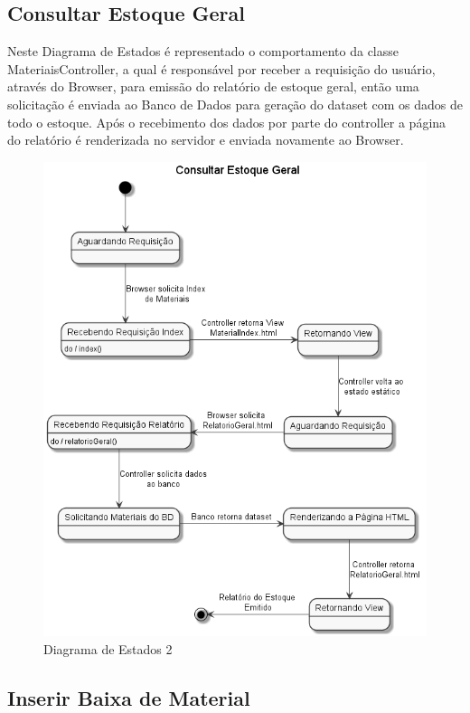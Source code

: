 \documentclass[rascunho,xindy,acronym,symbols]{fei}
\begin{document}
\pagebreak

\subsection{Consultar Estoque Geral}

Neste Diagrama de Estados é representado o comportamento da classe MateriaisController, a qual é responsável por receber a requisição do usuário, através do Browser, para emissão do relatório de estoque geral, então uma solicitação é enviada ao Banco de Dados para geração do dataset com os dados de todo o estoque. Após o recebimento dos dados por parte do controller a página do relatório é renderizada no servidor e enviada novamente ao Browser.

\begin{figure}[H]
    \centering
    \includegraphics[scale=0.6, width=400pt]{./Images/DE_-_Consultar_Estoque_Geral.png}
    \caption{Diagrama de Estados 2}
    \label{fig:diag_est2}
\end{figure}

\subsection{Inserir Baixa de Material}
\end{document}
